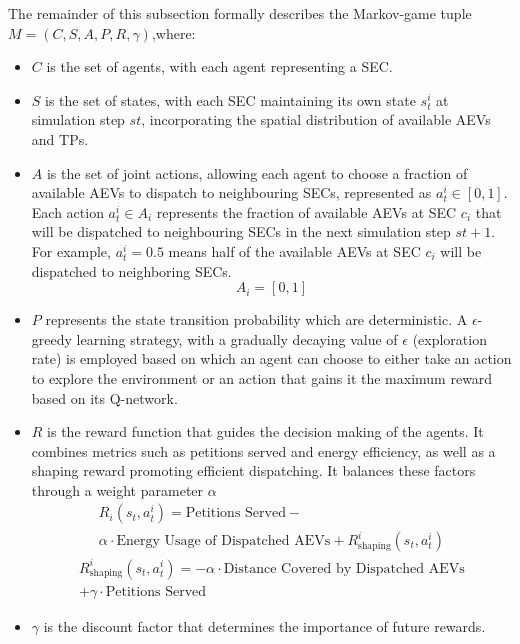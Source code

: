 The remainder of this subsection formally describes the Markov-game tuple \(M=(C, S, A, P, R, \gamma)\),where:

\begin{itemize}
    \item \(C\) is the set of agents, with each agent representing a SEC.
    \item \(S\) is the set of states, with each SEC maintaining its own state \(s_t^i\) at simulation step \(st\), incorporating the spatial distribution of available AEVs and TPs.
    \item \(A\) is the set of joint actions, allowing each agent to choose a fraction of available AEVs to dispatch to neighbouring SECs, represented as $a_t^i \in [0, 1]$. Each action $a_t^i \in A_i$ represents the fraction of available AEVs at SEC $c_i$ that will be dispatched to neighbouring SECs in the next simulation step $st+1$. For example, $a_t^i = 0.5$ means half of the available AEVs at SEC $c_i$ will be dispatched to neighboring SECs.
        \[ A_i = [0, 1] \]
    \item \(P\) represents the state transition probability which are deterministic. A $\epsilon$-greedy learning strategy, with a gradually decaying value of $\epsilon$ (exploration rate) is employed based on which an agent can choose to either take an action to explore the environment or an action that gains it the maximum reward based on its Q-network.
    \item \(R\) is the reward function that guides the decision making of the agents. It combines metrics such as petitions served and energy efficiency, as well as a shaping reward promoting efficient dispatching. It balances these factors through a weight parameter \(\alpha\)
        \begin{multline*}
            R_i(s_t, a_t^i) = \text{Petitions Served} - \\
            \alpha \cdot \text{Energy Usage of Dispatched AEVs}
            + R_{\text{shaping}}^i(s_t, a_t^i)
        \end{multline*}
        \begin{multline*}
                R_{\text{shaping}}^i(s_t, a_t^i) = -\alpha \cdot \text{Distance Covered by Dispatched AEVs} \\
                + \gamma \cdot \text{Petitions Served}
        \end{multline*}
    \item \(\gamma\) is the discount factor that determines the importance of future rewards.
\end{itemize}

